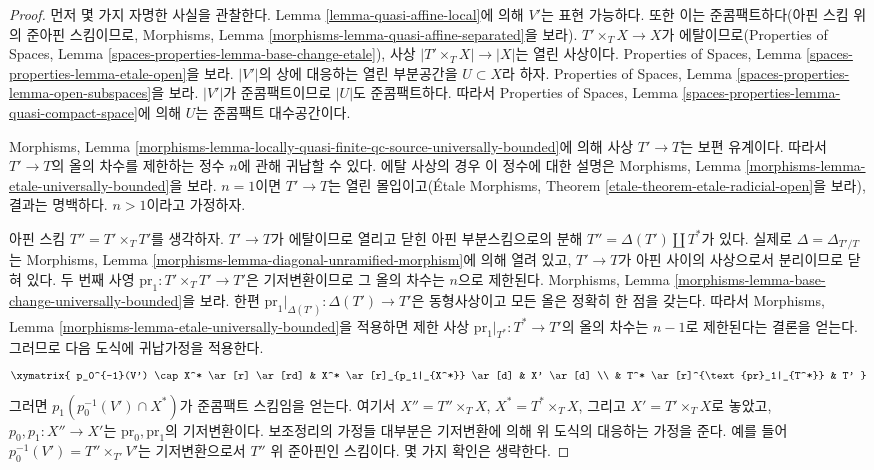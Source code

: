 \begin{proof}
먼저 몇 가지 자명한 사실을 관찰한다. Lemma
\ref{lemma-quasi-affine-local}에 의해 $V'$는 표현 가능하다. 또한 이는
준콤팩트하다(아핀 스킴 위의 준아핀 스킴이므로, Morphisms,
Lemma \ref{morphisms-lemma-quasi-affine-separated}을 보라).
$T' \times_T X \to X$가 에탈이므로(Properties of Spaces, Lemma
\ref{spaces-properties-lemma-base-change-etale}), 사상
$|T' \times_T X| \to |X|$는 열린 사상이다. Properties of Spaces,
Lemma \ref{spaces-properties-lemma-etale-open}을 보라. $|V'|$의 상에
대응하는 열린 부분공간을 $U \subset X$라 하자. Properties of Spaces,
Lemma \ref{spaces-properties-lemma-open-subspaces}을 보라. $|V'|$가
준콤팩트이므로 $|U|$도 준콤팩트하다. 따라서 Properties of Spaces,
Lemma \ref{spaces-properties-lemma-quasi-compact-space}에 의해 $U$는
준콤팩트 대수공간이다.

\medskip\noindent
Morphisms, Lemma
\ref{morphisms-lemma-locally-quasi-finite-qc-source-universally-bounded}에
의해 사상 $T' \to T$는 보편 유계이다. 따라서 $T' \to T$의 올의 차수를
제한하는 정수 $n$에 관해 귀납할 수 있다. 에탈 사상의 경우 이 정수에
대한 설명은 Morphisms, Lemma
\ref{morphisms-lemma-etale-universally-bounded}을 보라. $n = 1$이면
$T' \to T$는 열린 몰입이고(\'Etale Morphisms, Theorem
\ref{etale-theorem-etale-radicial-open}을 보라), 결과는 명백하다.
$n > 1$이라고 가정하자.

\medskip\noindent
아핀 스킴 $T'' = T' \times_T T'$를 생각하자. $T' \to T$가 에탈이므로
열리고 닫힌 아핀 부분스킴으로의 분해
$T'' = \Delta(T') \amalg T^*$가 있다. 실제로
$\Delta = \Delta_{T'/T}$는 Morphisms, Lemma
\ref{morphisms-lemma-diagonal-unramified-morphism}에 의해 열려 있고,
$T' \to T$가 아핀 사이의 사상으로서 분리이므로 닫혀 있다. 두 번째 사영
$\text{pr}_1 : T' \times_T T' \to T'$은 기저변환이므로 그 올의 차수는
$n$으로 제한된다. Morphisms, Lemma
\ref{morphisms-lemma-base-change-universally-bounded}을 보라. 한편
$\text{pr}_1|_{\Delta(T')} : \Delta(T') \to T'$은 동형사상이고 모든 올은
정확히 한 점을 갖는다. 따라서 Morphisms, Lemma
\ref{morphisms-lemma-etale-universally-bounded}을 적용하면 제한 사상
$\text{pr}_1|_{T^*} : T^* \to T'$의 올의 차수는 $n - 1$로 제한된다는
결론을 얻는다. 그러므로 다음 도식에 귀납가정을 적용한다.
$$
\xymatrix{
p_0^{-1}(V') \cap X^* \ar[r] \ar[rd] &
X^* \ar[r]_{p_1|_{X^*}} \ar[d] &
X' \ar[d] \\
& T^* \ar[r]^{\text{pr}_1|_{T^*}} & T'
}
$$
그러면 $p_1(p_0^{-1}(V') \cap X^*)$가 준콤팩트 스킴임을 얻는다. 여기서
$X'' = T'' \times_T X$, $X^* = T^* \times_T X$, 그리고
$X' = T' \times_T X$로 놓았고, $p_0, p_1 : X'' \to X'$는
$\text{pr}_0, \text{pr}_1$의 기저변환이다. 보조정리의 가정들 대부분은
기저변환에 의해 위 도식의 대응하는 가정을 준다. 예를 들어
$p_0^{-1}(V') = T'' \times_{T'} V'$는 기저변환으로서 $T''$ 위 준아핀인
스킴이다. 몇 가지 확인은 생략한다.


\end{proof}
